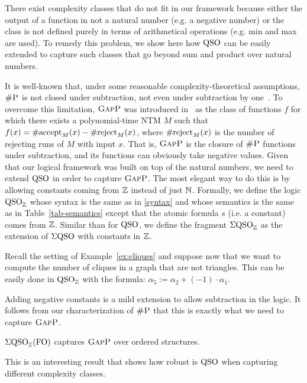 
There exist complexity classes that do not fit in our framework because either the output of a function in not a natural number (e.g. a negative number) or the class is not defined purely in terms of arithmetical operations (e.g. min and max are used).
To remedy this problem, we show here how ${\rm QSO}$ can be easily extended  to capture such classes that go beyond sum and product over natural numbers. 

It is well-known that, under some reasonable complexity-theoretical assumptions, $\text{\sc \#P}$ is not closed under subtraction, not even under subtraction by one~\cite{OH93}.
To overcome this limitation, $\text{\sc GapP}$ was introduced in~\cite{FFK94} as the class of functions $f$ for which there exists a polynomial-time NTM $M$ such that $f(x) = \text{\rm \#accept}_M(x) - \text{\rm \#reject}_M(x)$, where  $\text{\rm \#reject}_M(x)$ is the number of rejecting runs of $M$ with input $x$.
That is, $\text{\sc GapP}$ is the closure of $\text{\sc \#P}$ functions under subtraction, and its functions can obviously take negative values.
Given that our logical framework was built on top of the natural numbers, we need to extend ${\rm QSO}$ in order to %
capture $\text{\sc GapP}$. 
The most elegant way to do this is by allowing constants coming from $\mathbb{Z}$ instead of just $\mathbb{N}$. 
Formally, we define the logic ${\rm QSO}_{\mathbb{Z}}$ whose syntax is the same as in \eqref{syntax} and whose semantics is the same as in Table~\ref{tab-semantics} except that the atomic formula $s$ (i.e. a constant) comes from $\mathbb{Z}$.  
Similar than for ${\rm QSO}$, we define the fragment $\Sigma{\rm QSO}_{\mathbb{Z}}$ as the extension of $\Sigma{\rm QSO}$ with constants in $\mathbb{Z}$.
\begin{example}
	Recall the setting of Example~\ref{ex:cliques} and suppose now that we want to compute the number of cliques in a graph that are not triangles. This can be easily done in ${\rm QSO}_{\mathbb{Z}}$ with the formula:
	$
	\alpha_5 :=	\alpha_2 + (-1) \cdot \alpha_1 
	$.
\end{example}
Adding negative constants is a mild extension to allow subtraction in the logic. 
It follows from our characterization of $\text{\sc \#P}$ that this is exactly what we need to capture  $\text{\sc GapP}$.
\begin{corollary} \label{prop:capture-gapp}
	$\Sigma{\rm QSO}_{\mathbb{Z}}({\rm FO})$ captures $\text{\sc GapP}$ over ordered structures.
\end{corollary}
This is an interesting result that shows how robust is ${\rm QSO}$ when capturing different complexity classes.

